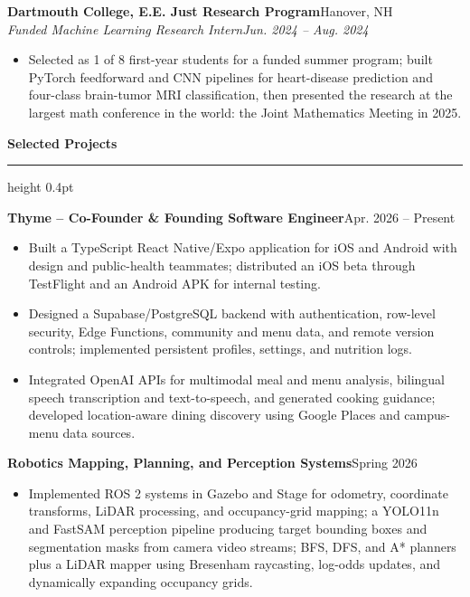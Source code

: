 \documentclass[letterpaper,10pt]{article}
\newcommand{\resumesection}[1]{%
  \vspace{3.1pt}%
  {\large\bfseries #1}\par
  \vspace{0.9pt}%
  \hrule height 0.4pt
  \vspace{2.0pt}%
}
\newcommand{\subheading}[4]{%
  \textbf{#1}\hfill #2\\
  \textit{#3}\hfill \textit{#4}\par
  \vspace{-1.5pt}%
}
\newcommand{\projectheading}[2]{%
  \textbf{#1}\hfill #2\par
  \vspace{-1.5pt}%
}
\begin{document}
\subheading
  {Dartmouth College, E.E. Just Research Program}{Hanover, NH}
  {Funded Machine Learning Research Intern}{Jun. 2024 -- Aug. 2024}

\begin{itemize}
  \item Selected as 1 of 8 first-year students for a funded summer program;
  built PyTorch feedforward and CNN pipelines for heart-disease prediction and
  four-class brain-tumor MRI classification, then presented the research at the largest math conference in the world: the Joint Mathematics Meeting in 2025.
\end{itemize}

\resumesection{Selected Projects}

\projectheading
  {Thyme -- Co-Founder \& Founding Software Engineer}
  {Apr. 2026 -- Present}

\begin{itemize}
  \item Built a TypeScript React Native/Expo application for iOS and Android
  with design and public-health teammates; distributed an iOS beta through
  TestFlight and an Android APK for internal testing.

  \item Designed a Supabase/PostgreSQL backend with authentication, row-level
  security, Edge Functions, community and menu data, and remote version
  controls; implemented persistent profiles, settings, and nutrition logs.

  \item Integrated OpenAI APIs for multimodal meal and menu analysis, bilingual
  speech transcription and text-to-speech, and generated cooking guidance;
  developed location-aware dining discovery using Google Places and
  campus-menu data sources.
\end{itemize}

\projectheading
  {Robotics Mapping, Planning, and Perception Systems}
  {Spring 2026}

\begin{itemize}
  \item Implemented ROS 2 systems in Gazebo and Stage for odometry, coordinate
  transforms, LiDAR processing, and occupancy-grid mapping; a YOLO11n and FastSAM perception pipeline producing target bounding boxes and segmentation masks from camera video streams; BFS, DFS, and A* planners plus a LiDAR mapper
  using Bresenham raycasting, log-odds updates, and dynamically expanding
  occupancy grids.
\end{itemize}
\end{document}
